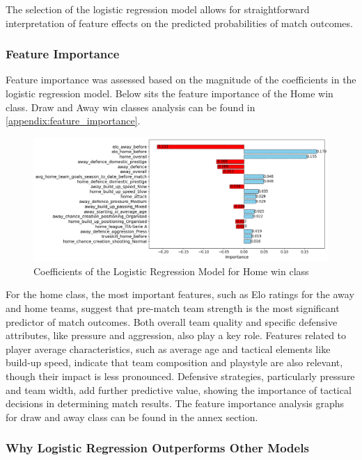 The selection of the logistic regression model allows for straightforward interpretation of feature effects on the predicted probabilities of match outcomes.

\subsubsection{Feature Importance}

Feature importance was assessed based on the magnitude of the coefficients in the logistic regression model. Below sits the feature importance of the Home win class. Draw and Away win classes analysis can be found in \ref{appendix:feature_importance}.


\begin{figure}[H]
    \centering
    \includegraphics[width=\textwidth, keepaspectratio]{images/top20_coeff_importance_lr_selected_features_home.png}
    \caption{Coefficients of the Logistic Regression Model for Home win class}
    \label{fig:feature_coefficients}
\end{figure}

For the home class, the most important features, such as Elo ratings for the away and home teams, suggest that pre-match team strength is the most significant predictor of match outcomes. Both overall team quality and specific defensive attributes, like pressure and aggression, also play a key role. Features related to player average characteristics, such as average age and tactical elements like build-up speed, indicate that team composition and playstyle are also relevant, though their impact is less pronounced. Defensive strategies, particularly pressure and team width, add further predictive value, showing the importance of tactical decisions in determining match results. The feature importance analysis graphs for draw and away class can be found in the annex section.


\subsubsection{Why Logistic Regression Outperforms Other Models}

